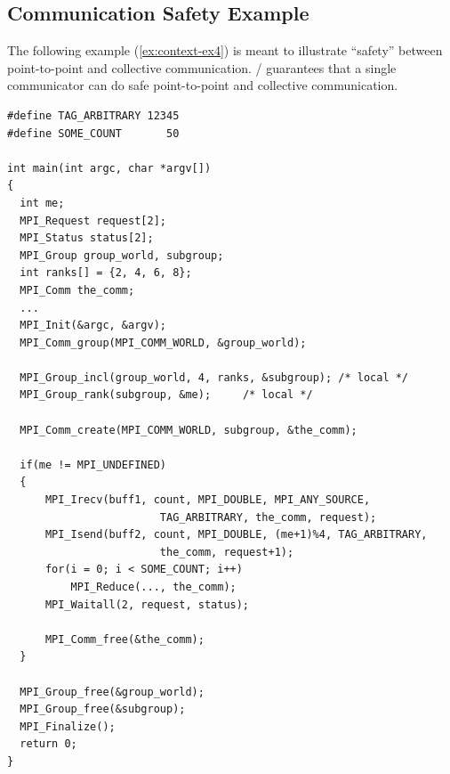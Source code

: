 \subsection{Communication Safety Example}
The following example (\ref{ex:context-ex4}) is meant to illustrate ``safety'' between
point-to-point and collective communication. \MPI/ guarantees that a single
communicator can do safe point-to-point and collective communication.
\begin{example}
\label{ex:context-ex4}
%
\begin{lstlisting}[language={[MPI]C}]
#define TAG_ARBITRARY 12345
#define SOME_COUNT       50

int main(int argc, char *argv[])
{
  int me;
  MPI_Request request[2];
  MPI_Status status[2];
  MPI_Group group_world, subgroup;
  int ranks[] = {2, 4, 6, 8};
  MPI_Comm the_comm;
  ...
  MPI_Init(&argc, &argv);
  MPI_Comm_group(MPI_COMM_WORLD, &group_world);

  MPI_Group_incl(group_world, 4, ranks, &subgroup); /* local */
  MPI_Group_rank(subgroup, &me);     /* local */

  MPI_Comm_create(MPI_COMM_WORLD, subgroup, &the_comm);

  if(me != MPI_UNDEFINED)
  {
      MPI_Irecv(buff1, count, MPI_DOUBLE, MPI_ANY_SOURCE,
                        TAG_ARBITRARY, the_comm, request);
      MPI_Isend(buff2, count, MPI_DOUBLE, (me+1)%4, TAG_ARBITRARY,
                        the_comm, request+1);
      for(i = 0; i < SOME_COUNT; i++)
          MPI_Reduce(..., the_comm);
      MPI_Waitall(2, request, status);

      MPI_Comm_free(&the_comm);
  }

  MPI_Group_free(&group_world);
  MPI_Group_free(&subgroup);
  MPI_Finalize();
  return 0;
}
\end{lstlisting}
\end{example}

